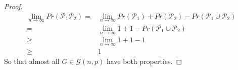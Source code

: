 \documentclass[12pt]{article}
\begin{document}
\begin{proof}
    \begin{align*}
        \lim_{n \to \infty} Pr(\mathcal{P}_1\mathcal{P}_2)=&\lim_{n \to \infty}Pr(\mathcal{P}_1)+Pr(\mathcal{P}_2)-Pr(\mathcal{P}_1\cup \mathcal{P}_2)\\
        =&\lim_{n \to \infty} 1+1-Pr(\mathcal{P}_1\cup \mathcal{P}_2)\\
        \geq & \lim_{n \to \infty} 1+1-1\\
        \geq & 1
    \end{align*}
    So that almost all $G\in \mathcal{G}(n,p)$ have both properties.
\end{proof}
\end{document}
